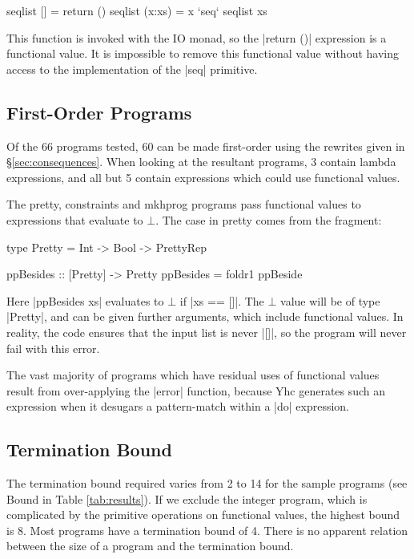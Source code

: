 \documentclass[preprint]{sigplanconf}
\begin{document}
\begin{code}
seqlist []      = return ()
seqlist (x:xs)  = x `seq` seqlist xs
\end{code}

This function is invoked with the IO monad, so the |return ()| expression is a functional value. It is impossible to remove this functional value without having access to the implementation of the |seq| primitive.

\subsection{First-Order Programs}

Of the 66 programs tested, 60 can be made first-order using the rewrites given in \S\ref{sec:consequences}. When looking at the resultant programs, 3 contain lambda expressions, and all but 5 contain expressions which could use functional values.

The pretty, constraints and mkhprog programs pass functional values to expressions that evaluate to $\bot$. The case in pretty comes from the fragment:

\begin{comment}
\begin{code}
data PrettyRep = PrettyRep
ppBeside :: Pretty -> Pretty -> Pretty
\end{code}
\end{comment}
\begin{code}
type Pretty = Int -> Bool -> PrettyRep

ppBesides :: [Pretty] -> Pretty
ppBesides = foldr1 ppBeside
\end{code}

Here |ppBesides xs| evaluates to $\bot$ if |xs == []|. The $\bot$ value will be of type |Pretty|, and can be given further arguments, which include functional values. In reality, the code ensures that the input list is never |[]|, so the program will never fail with this error.

The vast majority of programs which have residual uses of functional values result from over-applying the |error| function, because Yhc generates such an expression when it desugars a pattern-match within a |do| expression.

\subsection{Termination Bound}

The termination bound required varies from 2 to 14 for the sample programs (see Bound in Table \ref{tab:results}). If we exclude the integer program, which is complicated by the primitive operations on functional values, the highest bound is 8. Most programs have a termination bound of 4. There is no apparent relation between the size of a program and the termination bound.
\end{document}
